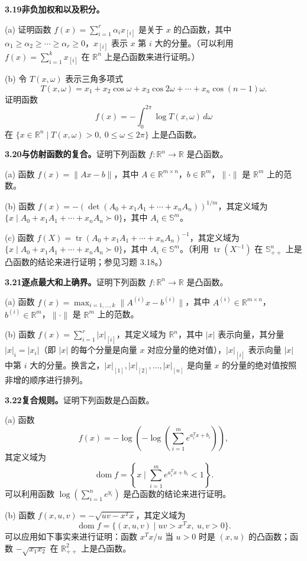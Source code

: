 \documentclass[UTF8, 12pt, fontset=fandol, oneside]{ctexart}
\DeclareMathOperator{\dom}{dom}
\begin{document}
\noindent\textbf{3.19\quad 非负加权和以及积分。}

(a) 证明函数 $f(x)=\sum_{i=1}^r\alpha_i x_{[i]}$ 是关于 $x$ 的凸函数，其中 $\alpha_1\geq\alpha_2\geq\cdots\geq\alpha_r\geq0$，$x_{[i]}$ 表示 $x$ 第 $i$ 大的分量。（可以利用 $f(x)=\sum_{i=1}^k x_{[i]}$ 在 $\mathbb{R}^n$ 上是凸函数来进行证明。）

(b) 令 $T(x,\omega)$ 表示三角多项式
\[
T(x,\omega)=x_1+x_2\cos\omega+x_3\cos2\omega+\cdots+x_n\cos(n-1)\omega.
\]
证明函数
\[
f(x)=-\int_0^{2\pi}\log T(x,\omega)\,d\omega
\]
在 $\{x\in\mathbb{R}^n\mid T(x,\omega)>0,\ 0\leq\omega\leq2\pi\}$ 上是凸函数。

\noindent\textbf{3.20\quad 与仿射函数的复合。}\quad 证明下列函数 $f:\mathbb{R}^n\to\mathbb{R}$ 是凸函数。

(a) 函数 $f(x)=\|Ax-b\|$，其中 $A\in\mathbb{R}^{m\times n}$，$b\in\mathbb{R}^m$，$\|\cdot\|$ 是 $\mathbb{R}^m$ 上的范数。

(b) 函数 $f(x)=-(\det(A_0+x_1A_1+\cdots+x_nA_n))^{1/m}$，其定义域为 $\{x\mid A_0+x_1A_1+\cdots+x_nA_n\succ0\}$，其中 $A_i\in\mathbb{S}^m$。

(c) 函数 $f(X)=\operatorname{tr}(A_0+x_1A_1+\cdots+x_nA_n)^{-1}$，其定义域为 $\{x\mid A_0+x_1A_1+\cdots+x_nA_n\succ0\}$，其中 $A_i\in\mathbb{S}^m$。（利用 $\operatorname{tr}(X^{-1})$ 在 $\mathbb{S}_{++}^n$ 上是凸函数的结论来进行证明；参见习题 3.18。）

\noindent\textbf{3.21\quad 逐点最大和上确界。}\quad 证明下列函数 $f:\mathbb{R}^n\to\mathbb{R}$ 是凸函数。

(a) 函数 $f(x)=\max_{i=1,\ldots,k}\|A^{(i)}x-b^{(i)}\|$，其中 $A^{(i)}\in\mathbb{R}^{m\times n}$，$b^{(i)}\in\mathbb{R}^m$，$\|\cdot\|$ 是 $\mathbb{R}^m$ 上的范数。

(b) 函数 $f(x)=\sum_{i=1}^r |x|_{[i]}$，其定义域为 $\mathbb{R}^n$，其中 $|x|$ 表示向量，其分量 $|x|_i=|x_i|$（即 $|x|$ 的每个分量是向量 $x$ 对应分量的绝对值），$|x|_{[i]}$ 表示向量 $|x|$ 中第 $i$ 大的分量。换言之，$|x|_{[1]},|x|_{[2]},\ldots,|x|_{[n]}$ 是向量 $x$ 的分量的绝对值按照非增的顺序进行排列。

\noindent\textbf{3.22\quad 复合规则。}\quad 证明下列函数是凸函数。

(a) 函数
\[
f(x)=-\log\left(-\log\left(\sum_{i=1}^m e^{a_i^Tx+b_i}\right)\right),
\]
其定义域为
\[
\dom f=\left\{x\mid \sum_{i=1}^m e^{a_i^Tx+b_i}<1\right\}.
\]
可以利用函数 $\log\left(\sum_{i=1}^n e^{y_i}\right)$ 是凸函数的结论来进行证明。

(b) 函数 $f(x,u,v)=-\sqrt{uv-x^Tx}$，其定义域为
\[
\dom f=\{(x,u,v)\mid uv>x^Tx,\ u,v>0\}.
\]
可以应用如下事实来进行证明：函数 $x^Tx/u$ 当 $u>0$ 时是 $(x,u)$ 的凸函数；函数 $-\sqrt{x_1x_2}$ 在 $\mathbb{R}_{++}^2$ 上是凸函数。
\end{document}
